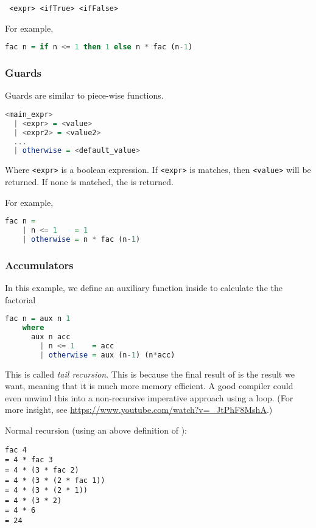\begin{center}
  \texttt{ <expr>  <ifTrue>  <ifFalse>}
\end{center}

For example,

\begin{lstlisting}[language=haskell]
  fac n = if n <= 1 then 1 else n * fac (n-1)
\end{lstlisting}

\subsubsection{Guards}
Guards are similar to piece-wise functions.

\begin{lstlisting}[language=haskell]
<main_expr>
  | <expr> = <value>
  | <expr2> = <value2>
  ...
  | otherwise = <default_value>
\end{lstlisting}
Where \texttt{<expr>} is a boolean expression. If \texttt{<expr>} is matches, then \texttt{<value>} will be returned. If none is matched, the \texttt{} is returned.

For example,

\begin{lstlisting}[language=haskell]
  fac n =
    | n <= 1    = 1
    | otherwise = n * fac (n-1)
\end{lstlisting}

\subsubsection{Accumulators}
In this example, we define an auxiliary function \texttt{} inside \texttt{} to calculate the the factorial

\begin{lstlisting}[language=haskell]
  fac n = aux n 1
    where
      aux n acc
        | n <= 1    = acc
        | otherwise = aux (n-1) (n*acc)
\end{lstlisting}

This is called \textit{tail recursion}. This is because the final result of \texttt{} is the result we want, meaning that it is much more memory efficient. A good compiler could even unwind this into a non-recursive imperative approach using a loop. (For more insight, see \url{https://www.youtube.com/watch?v=_JtPhF8MshA}.)

Normal recursion (using an above definition of \texttt{}):
\begin{verbatim}
fac 4
= 4 * fac 3
= 4 * (3 * fac 2)
= 4 * (3 * (2 * fac 1))
= 4 * (3 * (2 * 1))
= 4 * (3 * 2)
= 4 * 6
= 24
\end{verbatim}

